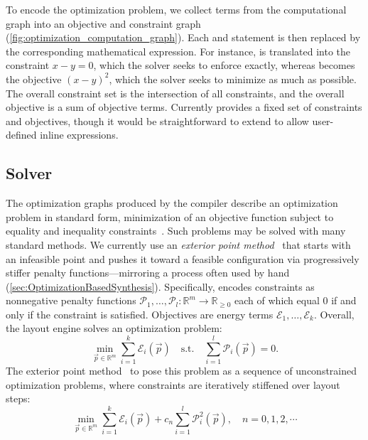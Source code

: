 
 To encode the optimization problem, we collect terms from the computational graph into an objective and constraint graph (\cref{fig:optimization_computation_graph}). Each  and  statement is then replaced by the corresponding mathematical expression.  For instance,  is translated into the constraint \(x-y=0\), which the solver seeks to enforce exactly, whereas  becomes the objective \((x-y)^2\), which the solver seeks to minimize as much as possible.  The overall constraint set is the intersection of all constraints, and the overall objective is a sum of objective terms. Currently \Penrose{} provides a fixed set of constraints and objectives, though it would be straightforward to extend \Style{} to allow user-defined inline expressions.


\subsection{Solver}
\label{sec:Solver}

The optimization graphs produced by the compiler describe an optimization problem in standard form, \ie minimization of an objective function subject to equality and inequality constraints~\cite[Section 4.1]{convexOptimization}.  Such problems may be solved with many standard methods. We currently use an \emph{exterior point method}~\cite{hiroshi_primal-dual_2010} that starts with an infeasible point and pushes it toward a feasible configuration via progressively stiffer penalty functions---mirroring a process often used by hand (\cref{sec:OptimizationBasedSynthesis}). Specifically, \Penrose encodes constraints as nonnegative penalty functions \(\mathcal{P}_1, \ldots, \mathcal{P}_l: \mathbb{R}^m \to \mathbb{R}_{\geq 0}\) each of which equal $0$ if and only if the constraint is satisfied. Objectives are energy terms  \(\mathcal{E}_1, \ldots, \mathcal{E}_k\). Overall, the \Penrose layout engine solves an optimization problem:%
\begin{equation}
   \label{eq:MainProblem}
       \min_{\vec p \in \mathbb{R}^m} \sum_{i=1}^k \mathcal{E}_i(\vec p)  \quad  \text{s.t.} \quad \sum_{i=1}^l \mathcal{P}_i(\vec p) = 0.
\end{equation}%
The exterior point method~\citep{hiroshi_primal-dual_2010} to pose this problem as a sequence of unconstrained optimization problems, where constraints are iteratively stiffened over layout steps: 
\begin{equation}
   \label{eq:ExteriorPointProblem}
   \min_{\vec p \in \mathbb{R}^m} \sum_{i=1}^k \mathcal{E}_i(\vec p) + c_n\sum_{i=1}^l \mathcal{P}_i^2(\vec p), \quad n = 0, 1, 2, \cdots
\end{equation}%

